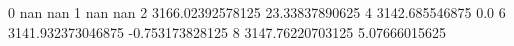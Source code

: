 0 nan nan
1 nan nan
2 3166.02392578125 23.33837890625
4 3142.685546875 0.0
6 3141.932373046875 -0.753173828125
8 3147.76220703125 5.07666015625

